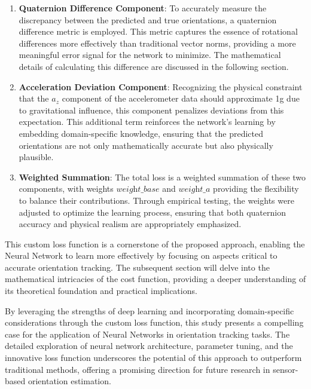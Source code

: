 \documentclass[conference]{IEEEtran}
\begin{document}
\begin{enumerate}
\item \textbf{Quaternion Difference Component}: To accurately measure the discrepancy between the predicted and true orientations, a quaternion difference metric is employed. This metric captures the essence of rotational differences more effectively than traditional vector norms, providing a more meaningful error signal for the network to minimize. The mathematical details of calculating this difference are discussed in the following section.
\item \textbf{Acceleration Deviation Component}: Recognizing the physical constraint that the \(a_z\) component of the accelerometer data should approximate 1g due to gravitational influence, this component penalizes deviations from this expectation. This additional term reinforces the network's learning by embedding domain-specific knowledge, ensuring that the predicted orientations are not only mathematically accurate but also physically plausible.
\item \textbf{Weighted Summation}: The total loss is a weighted summation of these two components, with weights \(\textit{weight\_base}\) and \(\textit{weight\_a}\) providing the flexibility to balance their contributions. Through empirical testing, the weights were adjusted to optimize the learning process, ensuring that both quaternion accuracy and physical realism are appropriately emphasized.
\end{enumerate}

This custom loss function is a cornerstone of the proposed approach, enabling the Neural Network to learn more effectively by focusing on aspects critical to accurate orientation tracking. The subsequent section will delve into the mathematical intricacies of the cost function, providing a deeper understanding of its theoretical foundation and practical implications.

By leveraging the strengths of deep learning and incorporating domain-specific considerations through the custom loss function, this study presents a compelling case for the application of Neural Networks in orientation tracking tasks. The detailed exploration of neural network architecture, parameter tuning, and the innovative loss function underscores the potential of this approach to outperform traditional methods, offering a promising direction for future research in sensor-based orientation estimation.

\end{document}
